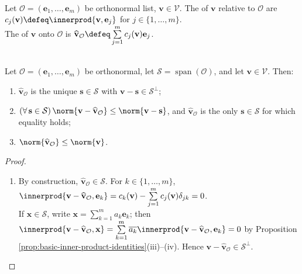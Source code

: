 \begin{definition} \label{def:fourier-coefficients-and-expansion} \\
Let $\mathcal{O}=(\mathbf{e}_1,\ldots,\mathbf{e}_m)$ be orthonormal list, $\mathbf{v}\in\mathcal{V}$. The  of $\mathbf{v}$ relative to $\mathcal{O}$ are $c_j(\mathbf{v})\defeq\innerprod{\mathbf{v},\mathbf{e}_j}$ for $j\in\{1,\ldots,m\}$.\\
The  of $\mathbf{v}$ onto $\mathcal{O}$ is $\widehat{\mathbf{v}}_{\mathcal{O}}\defeq\sum\limits_{j=1}^{m}c_j(\mathbf{v})\mathbf{e}_j$.
\end{definition}

\begin{theorem} \label{thm:fourier-expansion-best-approximation-finite} \\
Let $\mathcal{O}=(\mathbf{e}_1,\ldots,\mathbf{e}_m)$ be orthonormal, let $\mathcal{S}=\operatorname{span}(\mathcal{O})$, and let $\mathbf{v}\in\mathcal{V}$. Then:
\begin{enumerate}[label=(\roman*)]
\setlength{\itemsep}{0pt}
\item $\widehat{\mathbf{v}}_{\mathcal{O}}$ is the unique $\mathbf{s}\in\mathcal{S}$ with $\mathbf{v}-\mathbf{s}\in\mathcal{S}^{\perp}$;
\item $(\forall\,\mathbf{s}\in\mathcal{S})\,\norm{\mathbf{v}-\widehat{\mathbf{v}}_{\mathcal{O}}}\leq\norm{\mathbf{v}-\mathbf{s}}$, and $\widehat{\mathbf{v}}_{\mathcal{O}}$ is the only $\mathbf{s}\in\mathcal{S}$ for which equality holds;
\item $\norm{\widehat{\mathbf{v}}_{\mathcal{O}}}\leq\norm{\mathbf{v}}$.
\end{enumerate}
\begin{proof}
\begin{enumerate}[label=(\roman*)]
\setlength{\itemsep}{0pt}
\item By construction, $\widehat{\mathbf{v}}_{\mathcal{O}}\in\mathcal{S}$. For $k\in\{1,\ldots,m\}$, $\innerprod{\mathbf{v}-\widehat{\mathbf{v}}_{\mathcal{O}},\mathbf{e}_k}=c_k(\mathbf{v})-\sum\limits_{j=1}^{m}c_j(\mathbf{v})\delta_{jk}=0$.\\
If $\mathbf{x}\in\mathcal{S}$, write $\mathbf{x}=\sum\limits_{k=1}^{m}a_k\mathbf{e}_k$; then $\innerprod{\mathbf{v}-\widehat{\mathbf{v}}_{\mathcal{O}},\mathbf{x}}=\sum\limits_{k=1}^{m}\overline{a_k}\innerprod{\mathbf{v}-\widehat{\mathbf{v}}_{\mathcal{O}},\mathbf{e}_k}=0$ by Proposition \ref{prop:basic-inner-product-identities}(iii)--(iv). Hence $\mathbf{v}-\widehat{\mathbf{v}}_{\mathcal{O}}\in\mathcal{S}^{\perp}$.\\

\end{enumerate}
\end{proof}
\end{theorem}
